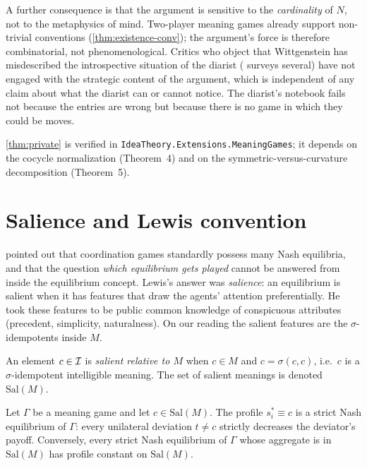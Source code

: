 A further consequence is that the argument is sensitive to the
\emph{cardinality} of $N$, not to the metaphysics of mind. Two-player
meaning games already support non-trivial conventions
(\cref{thm:existence-conv}); the argument's force is therefore
combinatorial, not phenomenological. Critics who object that
Wittgenstein has misdescribed the introspective situation of the
diarist (\cite{Kripke1982} surveys several) have not engaged with the
strategic content of the argument, which is independent of any claim
about what the diarist can or cannot notice. The diarist's notebook
fails not because the entries are wrong but because there is no game
in which they could be moves.

\formalstatus \cref{thm:private} is verified in
\texttt{IdeaTheory.Extensions.MeaningGames}; it depends on the cocycle
normalization (Theorem~4) and on the symmetric-versus-curvature
decomposition (Theorem~5).

\section{Salience and Lewis convention}\label{sec:salience}

\cite{Lewis1969} pointed out that coordination games standardly possess
many Nash equilibria, and that the question \emph{which equilibrium
gets played} cannot be answered from inside the equilibrium concept.
Lewis's answer was \emph{salience}: an equilibrium is salient when it
has features that draw the agents' attention preferentially. He took
these features to be public common knowledge of conspicuous attributes
(precedent, simplicity, naturalness). On our reading the salient
features are the $\sigma$-idempotents inside $M$.

\begin{definition}\label{def:salient}
An element $c\in\mathcal{I}$ is \emph{salient relative to $M$} when
$c\in M$ and $c=\sigma(c,c)$, i.e.\ $c$ is a $\sigma$-idempotent
intelligible meaning. The set of salient meanings is denoted
$\mathrm{Sal}(M)$.
\end{definition}

\begin{theorem}\label{thm:salient}
Let $\Gamma$ be a meaning game and let $c\in\mathrm{Sal}(M)$. The
profile $s^\ast_i\equiv c$ is a strict Nash equilibrium of $\Gamma$:
every unilateral deviation $t\neq c$ strictly decreases the deviator's
payoff. Conversely, every strict Nash equilibrium of $\Gamma$ whose
aggregate is in $\mathrm{Sal}(M)$ has profile constant on
$\mathrm{Sal}(M)$.
\end{theorem}

